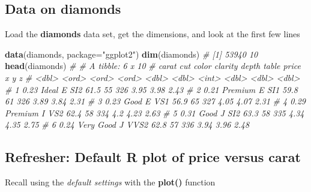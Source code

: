 \documentclass[
]{article}
\newenvironment{Shaded}{\begin{snugshade}}{\end{snugshade}}
\newcommand{\AttributeTok}[1]{\textcolor[rgb]{0.13,0.29,0.53}{#1}}
\newcommand{\CommentTok}[1]{\textcolor[rgb]{0.56,0.35,0.01}{\textit{#1}}}
\newcommand{\FunctionTok}[1]{\textcolor[rgb]{0.13,0.29,0.53}{\textbf{#1}}}
\newcommand{\NormalTok}[1]{#1}
\newcommand{\SpecialCharTok}[1]{\textcolor[rgb]{0.81,0.36,0.00}{\textbf{#1}}}
\newcommand{\StringTok}[1]{\textcolor[rgb]{0.31,0.60,0.02}{#1}}
\begin{document}
\hypertarget{data-on-diamonds}{%
\subsection{Data on diamonds}\label{data-on-diamonds}}

Load the \textbf{diamonds} data set, get the dimensions, and look at the
first few lines

\begin{Shaded}
\begin{Highlighting}[]
\FunctionTok{data}\NormalTok{(diamonds, }\AttributeTok{package=}\StringTok{"ggplot2"}\NormalTok{)}
\FunctionTok{dim}\NormalTok{(diamonds)}
\CommentTok{\# [1] 53940    10}
\FunctionTok{head}\NormalTok{(diamonds)}
\CommentTok{\# \# A tibble: 6 x 10}
\CommentTok{\#   carat cut       color clarity depth table price     x     y     z}
\CommentTok{\#   \textless{}dbl\textgreater{} \textless{}ord\textgreater{}     \textless{}ord\textgreater{} \textless{}ord\textgreater{}   \textless{}dbl\textgreater{} \textless{}dbl\textgreater{} \textless{}int\textgreater{} \textless{}dbl\textgreater{} \textless{}dbl\textgreater{} \textless{}dbl\textgreater{}}
\CommentTok{\# 1  0.23 Ideal     E     SI2      61.5    55   326  3.95  3.98  2.43}
\CommentTok{\# 2  0.21 Premium   E     SI1      59.8    61   326  3.89  3.84  2.31}
\CommentTok{\# 3  0.23 Good      E     VS1      56.9    65   327  4.05  4.07  2.31}
\CommentTok{\# 4  0.29 Premium   I     VS2      62.4    58   334  4.2   4.23  2.63}
\CommentTok{\# 5  0.31 Good      J     SI2      63.3    58   335  4.34  4.35  2.75}
\CommentTok{\# 6  0.24 Very Good J     VVS2     62.8    57   336  3.94  3.96  2.48}
\end{Highlighting}
\end{Shaded}

\hypertarget{refresher-default-r-plot-of-price-versus-carat}{%
\subsection{Refresher: Default R plot of price versus
carat}\label{refresher-default-r-plot-of-price-versus-carat}}

Recall using the \emph{default settings} with the \textbf{plot()}
function

\begin{Shaded}
\end{Shaded}
\end{document}
